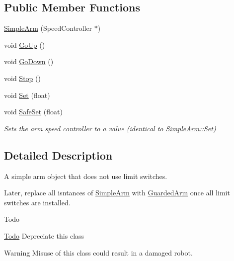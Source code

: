 \subsection*{\-Public \-Member \-Functions}
\begin{DoxyCompactItemize}
\item 
\hyperlink{class_simple_arm_aaed7ab747ae275f4915adc4511a85ada}{\-Simple\-Arm} (\-Speed\-Controller $\ast$)
\item 
void \hyperlink{class_simple_arm_aba35dd813b5e8496778aaf0964d8eb21}{\-Go\-Up} ()
\item 
void \hyperlink{class_simple_arm_a9d37d357635e74bdfb15553b353ea3af}{\-Go\-Down} ()
\item 
void \hyperlink{class_simple_arm_a3ac13b463aaf6eb52fef1ecf9eed750e}{\-Stop} ()
\item 
void \hyperlink{class_simple_arm_a99217123ae487fc86d4d2400b73c8b2f}{\-Set} (float)
\item 
void \hyperlink{class_simple_arm_a71434f7cfcaf0451ffff5283a6f4d38c}{\-Safe\-Set} (float)
\begin{DoxyCompactList}\small\item\em \-Sets the arm speed controller to a value (identical to \hyperlink{class_simple_arm_a99217123ae487fc86d4d2400b73c8b2f}{\-Simple\-Arm\-::\-Set}) \end{DoxyCompactList}\end{DoxyCompactItemize}


\subsection{\-Detailed \-Description}
\-A simple arm object that does not use limit switches. 

\-Later, replace all isntances of \hyperlink{class_simple_arm}{\-Simple\-Arm} with \hyperlink{class_guarded_arm}{\-Guarded\-Arm} once all limit switches are installed. \begin{DoxyRefDesc}{\-Todo}
\item[\hyperlink{todo__todo000003}{\-Todo}]\-Depreciate this class \end{DoxyRefDesc}
\begin{DoxyWarning}{\-Warning}
\-Misuse of this class could result in a damaged robot. 
\end{DoxyWarning}


